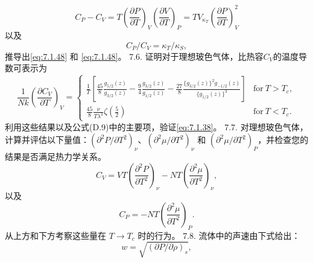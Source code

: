 \begin{equation}\tag{7.5.45}\label{eq:7.5.45}
C _ { P } - C _ { V } = T \left( \frac { \partial P } { \partial T } \right) _ { V } \left( \frac { \partial V } { \partial T } \right) _ { P } = T V _ { \kappa _ { T } } \left( \frac { \partial P } { \partial T } \right) _ { V } ^{2}
\end{equation}
以及
\begin{equation}\tag{7.5.46}\label{eq:7.5.46}
C _ { P } / C _ { V } = \kappa _ { T } / \kappa _ { S } ,
\end{equation}
推导出\autoref{eq:7.1.48} 和 \autoref{eq:7.1.48}。
7.6. 证明对于理想玻色气体，比热容\(C_V\)的温度导数可表示为
\begin{equation}\tag{7.5.47}\label{eq:7.5.47}
\frac { 1 } { N k } \left( \frac { \partial C _ { V } } { \partial T } \right) _ { V } = \left\{ \begin{array}{ll} { \frac { 1 } { T } \left[ \frac { 45 } { 8 } \frac { g _ { 5 / 2 } ( z ) } { g _ { 3 / 2 } ( z ) } - \frac { 9 } { 4 } \frac { g _ { 3 / 2 } ( z ) } { g _ { 1 / 2 } ( z ) } - \frac { 27 } { 8 } \frac { \{ g _ { 3 / 2 } ( z ) \} ^{2} g _ { - 1 / 2 } ( z ) } { \{ g _ { 1 / 2 } ( z ) \} ^{3} } \right] } & { \mathrm { f o r ~ } T > T _ { c } , } \\{ \frac { 45 } { 8 } \frac { \nu } { T \lambda ^{3} } \zeta \left( \frac { 5 } { 2 } \right) } & { \mathrm { f o r ~ } T < T _ { c } . } \end{array} \right.
\end{equation}
利用这些结果以及公式(D.9)中的主要项，验证\autoref{eq:7.1.38}。
7.7. 对理想玻色气体，计算并评估以下量值：\((\partial^2P/\partial T^2)_\nu\)、\((\partial^2\mu/\partial T^2)_\nu\) 和 \((\partial^2\mu/\partial T^2)_P\)，并检查您的结果是否满足热力学关系。
\begin{equation}\tag{7.5.48}\label{eq:7.5.48}
C _ { V } = V T \left( \frac { \partial ^{2} P } { \partial T ^{2} } \right) _ { \nu } - N T \left( \frac { \partial ^{2} \mu } { \partial T ^{2} } \right) _ { \nu } ,
\end{equation}
以及
\begin{equation}\tag{7.5.49}\label{eq:7.5.49}
C _ { P } = - N T \left( \frac { \partial ^{2} \mu } { \partial T ^{2} } \right) _ { P } .
\end{equation}
从上方和下方考察这些量在 \(T \rightarrow T_{c}\) 时的行为。
7.8. 流体中的声速由下式给出：
\begin{equation}\tag{7.5.50}\label{eq:7.5.50}
w = \sqrt { ( \partial P / \partial \rho ) _ { s } } ,
\end{equation}
